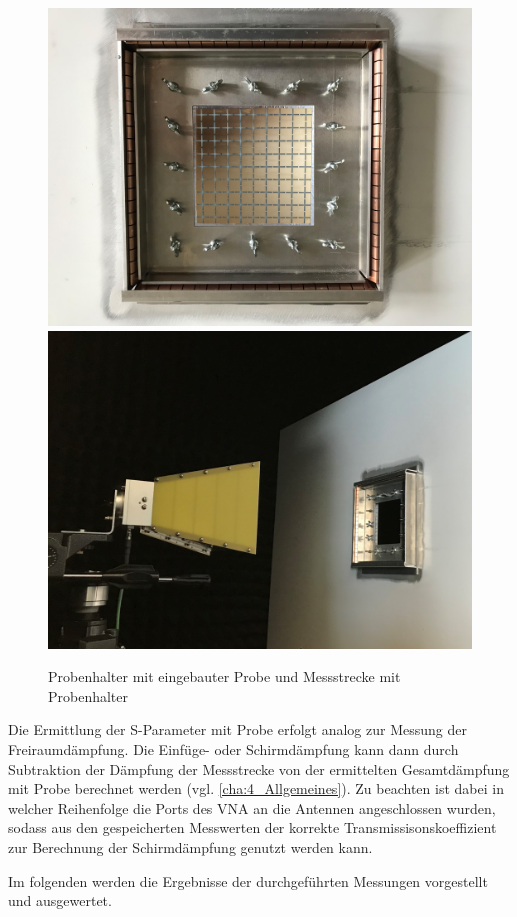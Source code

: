 \begin{figure}[ht]
    \centering
    \includegraphics[height=.2\textheight, draft = true]{Kapitel/Kapitel4/Probenhalter.jpg}
    \hspace{1cm}
    \includegraphics[height=.2\textheight, draft = true]{Abbildungen/Kapitel4/IMG_5675_trimmed.jpg}
    \caption{Probenhalter mit eingebauter Probe und Messstrecke mit Probenhalter}
    \label{fig:4_Probenhalter_mit_Probe}
\end{figure}


Die Ermittlung der S-Parameter mit Probe erfolgt analog zur Messung der Freiraumdämpfung. Die Einfüge- oder Schirmdämpfung kann dann durch Subtraktion der Dämpfung der Messstrecke von der ermittelten Gesamtdämpfung mit Probe berechnet werden (vgl. \Abschnitt\ref{cha:4_Allgemeines}). Zu beachten ist dabei in welcher Reihenfolge die Ports des VNA an die Antennen angeschlossen wurden, sodass aus den gespeicherten Messwerten der korrekte Transmissisonskoeffizient zur Berechnung der Schirmdämpfung genutzt werden kann.
\par
\vspace{\linespace}
Im folgenden \Abschnitt werden die Ergebnisse der durchgeführten Messungen vorgestellt und ausgewertet.














